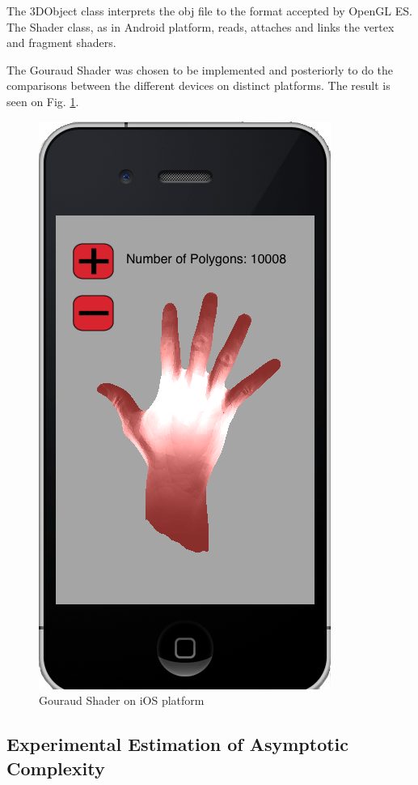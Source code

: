 \documentclass[10pt, conference, compsocconf]{IEEEtran}
\begin{document}
{ The 3DObject class interprets the obj file to the format accepted by OpenGL ES. The Shader class, as in Android platform, reads, attaches and links the vertex
and fragment shaders. 

 The Gouraud Shader was chosen to be implemented and posteriorly to do the
comparisons between the different devices on distinct platforms. The result is seen on Fig. \ref{gouraud_ios}.

	\begin{figure}[!t]
	\centering
		\includegraphics[keepaspectratio=true,scale=0.25]{gouraud_ios.png}
	\caption{Gouraud Shader on iOS platform }
	\label{gouraud_ios}
	\end{figure}
	
\subsection{Experimental Estimation of Asymptotic Complexity}
\label{sec:assy}

}
\end{document}
